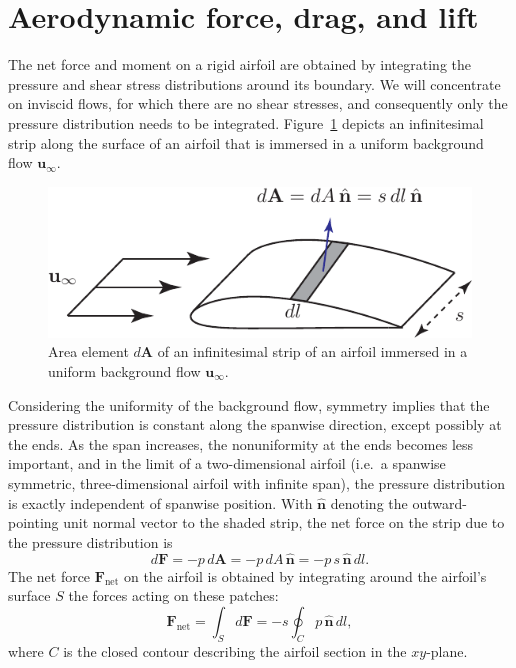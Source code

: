 \documentclass[10pt,fleqn,reqno]{article}
\newcommand\ie{i.e.~}
\newcommand\figref[1]{\mbox{Figure \ref{#1}}}
\begin{document}
\section{Aerodynamic force, drag, and lift}
The net force and moment on a rigid airfoil are obtained by integrating the pressure and shear stress distributions around its boundary.  We will concentrate on inviscid flows, for which there are no shear stresses, and consequently only the pressure distribution needs to be integrated.  \figref{fig:airfoil-patch} depicts an infinitesimal strip along the surface of an airfoil that is immersed in a uniform background flow $\mathbf u_\infty$.
\begin{figure}[H]
\begin{center}
\includegraphics[scale=.8]{Figures/airfoil-patch.pdf}
\caption{Area element $d\mathbf A$ of an infinitesimal strip of an airfoil immersed in a uniform background flow $\mathbf u_\infty$.}\label{fig:airfoil-patch}
\end{center}
\end{figure}
Considering the uniformity of the background flow, symmetry implies that the pressure distribution is constant along the spanwise direction, except possibly at the ends.  As the span increases, the nonuniformity at the ends becomes less important, and in the limit of a two-dimensional airfoil (\ie a spanwise symmetric, three-dimensional airfoil with infinite span), the pressure distribution is exactly independent of spanwise position.  With $\hat{\mathbf n}$ denoting the outward-pointing unit normal vector to the shaded strip, the net force on the strip due to the pressure distribution is \[d\mathbf F = -p\,d\mathbf A = -p\,dA\,\hat{\mathbf n} = -p\,s\,\hat{\mathbf n}\,dl.\]  The net force $\mathbf F_\text{net}$ on the airfoil is obtained by integrating around the airfoil's surface $S$ the forces acting on these patches:
\begin{equation}\label{eqn:net-force}
\mathbf F_\text{net} = \int_S d\mathbf F = -s\oint_C p\,\hat{\mathbf n}\,dl,
\end{equation}
where $C$ is the closed contour describing the airfoil section in the $xy$-plane.  
\end{document}
